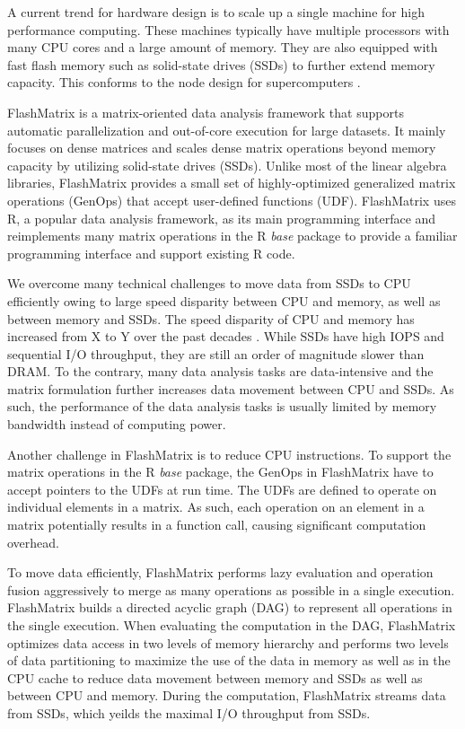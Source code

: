 
A current trend for hardware design is to scale up a single machine for high
performance computing.
These machines typically have multiple processors with many CPU cores and
a large amount of memory. They are also equipped with fast flash
memory such as solid-state drives (SSDs) to further extend memory capacity.
This conforms to the node design for supercomputers \cite{Ang14}.

FlashMatrix is a matrix-oriented data analysis framework that supports automatic
parallelization and out-of-core execution for large datasets. It mainly focuses
on dense matrices and scales
dense matrix operations beyond memory capacity by utilizing solid-state drives
(SSDs). Unlike most of the linear algebra libraries, FlashMatrix provides a small
set of highly-optimized generalized matrix operations (GenOps) that accept
user-defined functions (UDF). FlashMatrix uses R, a popular data
analysis framework, as its main programming interface and reimplements
many matrix operations in the R \textit{base} package to provide a familiar
programming interface and support existing R code.


We overcome many technical challenges to move data from SSDs to CPU efficiently
owing to large speed disparity between CPU and memory, as well as between memory and
SSDs. The speed disparity of CPU and memory has increased from X to Y over
the past decades \cite{Wilkes01}. While SSDs have high IOPS and sequential
I/O throughput, they are still an order of magnitude slower than DRAM.
To the contrary, many data analysis tasks are data-intensive and the matrix
formulation further increases data movement between CPU and SSDs. As such,
the performance of the data analysis tasks is usually limited by memory
bandwidth instead of computing power.

Another challenge in FlashMatrix is to reduce CPU instructions. To support
the matrix operations in the R \textit{base} package, the GenOps in FlashMatrix
have to accept pointers to the UDFs at run time. The UDFs are defined to
operate on individual elements in a matrix. As such, each operation on an element
in a matrix potentially results in a function call, causing significant
computation overhead.

To move data efficiently, FlashMatrix performs lazy evaluation and operation
fusion aggressively to merge as many operations as possible in a single execution.
FlashMatrix builds a directed acyclic graph (DAG) to represent all operations
in the single execution. When evaluating the computation in the DAG, FlashMatrix
optimizes data access in two levels of memory hierarchy and performs two levels
of data partitioning to maximize the use of the data in memory
as well as in the CPU cache to reduce data movement between memory and SSDs
as well as between CPU and memory. During the computation, FlashMatrix
streams data from SSDs, which yeilds the maximal I/O throughput from SSDs.

